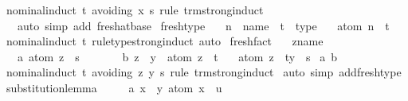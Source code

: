 \begin{isabellebody}
\isamarkupfalse%
\ {\isacharparenleft}nominal{\isacharunderscore}induct\ t\ avoiding{\isacharcolon}\ x\ s\ rule{\isacharcolon}\ trm{\isachardot}strong{\isacharunderscore}induct{\isacharparenright}\isanewline
\ \ \ {\isacharparenleft}auto\ simp\ add{\isacharcolon}\ fresh{\isacharunderscore}at{\isacharunderscore}base{\isacharparenright}%
\endisatagproof
{\isafoldproof}%
%
\isadelimproof
\isanewline
%
\endisadelimproof
\isanewline
{}\isamarkupfalse%
\ fresh{\isacharunderscore}type{\isacharcolon}\isanewline
\ \ \ n\ {\isacharcolon}{\isacharcolon}\ name\ \ t\ {\isacharcolon}{\isacharcolon}\ type\isanewline
\ \ \ {\isachardoublequoteopen}atom\ n\ {\isasymsharp}\ t{\isachardoublequoteclose}\isanewline
%
\isadelimproof
%
\endisadelimproof
%
\isatagproof
{}\isamarkupfalse%
\ {\isacharparenleft}nominal{\isacharunderscore}induct\ t\ rule{\isacharcolon}type{\isachardot}strong{\isacharunderscore}induct{\isacharcomma}\ auto{\isacharparenright}%
\endisatagproof
{\isafoldproof}%
%
\isadelimproof
\isanewline
%
\endisadelimproof
\isanewline
{}\isamarkupfalse%
\ fresh{\isacharunderscore}fact{\isacharcolon}\isanewline
\ \ \ z{\isacharcolon}{\isacharcolon}{\isachardoublequoteopen}name{\isachardoublequoteclose}\isanewline
\ \ \ a{\isacharcolon}\ {\isachardoublequoteopen}atom\ z\ {\isasymsharp}\ s{\isachardoublequoteclose}\isanewline
\ \ \ \ \ \ \ b{\isacharcolon}\ {\isachardoublequoteopen}z\ {\isacharequal}\ y\ {\isasymor}\ atom\ z\ {\isasymsharp}\ t{\isachardoublequoteclose}\isanewline
\ \ \ {\isachardoublequoteopen}atom\ z\ {\isasymsharp}\ t{\isacharbrackleft}y\ {\isacharcolon}{\isacharcolon}{\isacharequal}\ s{\isacharbrackright}{\isachardoublequoteclose}\isanewline
%
\isadelimproof
%
\endisadelimproof
%
\isatagproof
{}\isamarkupfalse%
\ a\ b\isanewline
{}\isamarkupfalse%
\ {\isacharparenleft}nominal{\isacharunderscore}induct\ t\ avoiding{\isacharcolon}\ z\ y\ s\ rule{\isacharcolon}\ trm{\isachardot}strong{\isacharunderscore}induct{\isacharparenright}\isanewline
{}\isamarkupfalse%
\ {\isacharparenleft}auto\ simp\ add{\isacharcolon}fresh{\isacharunderscore}type{\isacharparenright}%
\endisatagproof
{\isafoldproof}%
%
\isadelimproof
\isanewline
%
\endisadelimproof
\isanewline
{}\isamarkupfalse%
\ substitution{\isacharunderscore}lemma{\isacharcolon}\ \ \isanewline
\ \ \ a{\isacharcolon}\ {\isachardoublequoteopen}x\ {\isasymnoteq}\ y{\isachardoublequoteclose}\ {\isachardoublequoteopen}atom\ x\ {\isasymsharp}\ u{\isachardoublequoteclose}\isanewline

\end{isabellebody}
